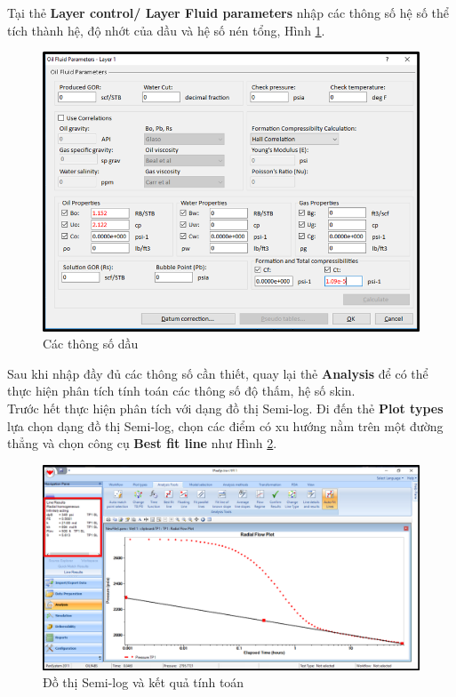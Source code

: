 \documentclass[12pt,a4paper]{report}
\begin{document}
    \clearpage
    \noindent
Tại thẻ \textbf{Layer control/ Layer Fluid parameters} nhập các thông số hệ số thể tích thành hệ, độ nhớt của dầu và hệ số nén tổng, Hình \ref{fig:oil_params}.
    \begin{figure}[h]
    	\centering
        \includegraphics[scale=.7]{welltest/oil_params.png}
        \caption{Các thông số dầu}
        \label{fig:oil_params}
    \end{figure}
    \clearpage
    \noindent
Sau khi nhập đầy đủ các thông số cần thiết, quay lại thẻ \textbf{Analysis} để có thể thực hiện phân tích tính toán các thông số độ thấm, hệ số skin.\\
Trước hết thực hiện phân tích với dạng đồ thị Semi-log. Đi đến thẻ \textbf{Plot types} lựa chọn dạng đồ thị Semi-log, chọn các điểm có xu hướng nằm trên một đường thẳng và chọn công cụ \textbf{Best fit line} như Hình \ref{fig:semi_log_w}.
	\begin{figure}[h]
    	\centering
        \includegraphics[scale=.45]{welltest/semilog_result.png}
        \caption{Đồ thị Semi-log và kết quả tính toán}
        \label{fig:semi_log_w}
    \end{figure}
\end{document}
